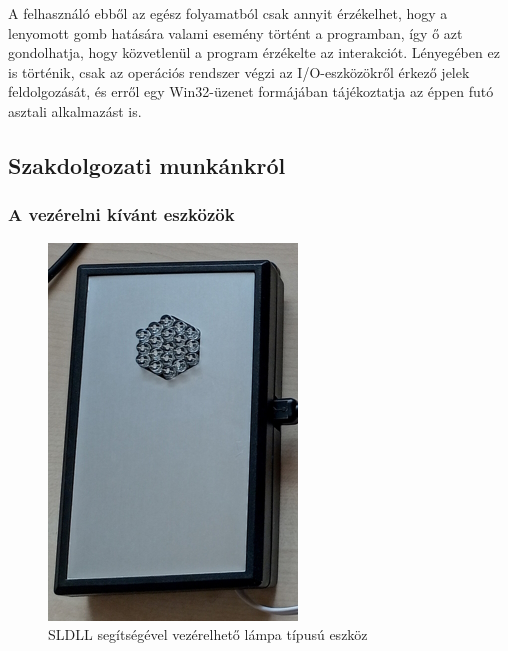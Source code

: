 \documentclass[tocnopagenum]{thesis-ekf}
\begin{document}
	A felhasználó ebből az egész folyamatból csak annyit érzékelhet, hogy a lenyomott gomb hatására valami esemény történt a programban, így ő azt gondolhatja, hogy közvetlenül a program érzékelte az interakciót. Lényegében ez is történik, csak az operációs rendszer végzi az I/O-eszközökről érkező jelek feldolgozását, és erről egy Win32-üzenet formájában tájékoztatja az éppen futó asztali alkalmazást is.

	\subsection{Szakdolgozati munkánkról}
	\subsubsection{A vezérelni kívánt eszközök}
	
	\begin{figure}[H]
		\centering
		\includegraphics[scale=0.45]{images/foto_lampa.jpg}
		\caption{SLDLL segítségével vezérelhető lámpa típusú eszköz}
		\label{fig:foto_lampa}
	\end{figure}
	
\end{document}
